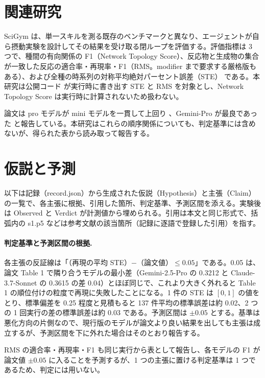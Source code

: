 \documentclass{article}
\providecommand{\unverified}[1]{#1}
\begin{document}
\section{関連研究}
\label{sec:related}
SciGym \citep{duan-2025-measuring} は、単一スキルを測る既存のベンチマークと異なり、エージェントが自ら摂動実験を設計してその結果を受け取る閉ループを評価する。評価指標は 3 つで、種間の有向関係の F1（Network Topology Score）、反応物と生成物の集合が一致した反応の適合率・再現率・F1（RMS。modifier まで要求する厳格版もある）\cite[s1.p8]{duan-2025-measuring}、および全種の時系列の対称平均絶対パーセント誤差（STE）\cite[s1.p9]{duan-2025-measuring} である。本研究は公開コード \citep{h4duan-2025-scigym} が実行時に書き出す STE と RMS を対象とし、Network Topology Score は実行時に計算されないため扱わない。

論文は pro モデルが mini モデルを一貫して上回り \cite[s1.p6]{duan-2025-measuring}、Gemini-Pro が最良であった \cite[s1.p7]{duan-2025-measuring} と報告している。本研究はこれらの順序関係についても、判定基準には含めないが、得られた表から読み取って報告する。

\section{仮説と予測}
\label{sec:hypothesis}
以下は記録（record.json）から生成された仮説（Hypothesis）と主張（Claim）の一覧で、各主張に根拠、引用した箇所、判定基準、予測区間を添える。実験後は Observed と Verdict が計測値から埋められる。引用は本文と同じ形式で、括弧内の s1.p5 などは参考文献の該当箇所（記録に逐語で登録した引用）を指す。



\paragraph{判定基準と予測区間の根拠.}
各主張の反証線は「（再現の平均 STE）$-$（論文値）$\le 0.05$」である。0.05 は、論文 Table 1 で隣り合うモデルの最小差（Gemini-2.5-Pro の \unverified{0.3212} と Claude-3.7-Sonnet の \unverified{0.3615} の差 \unverified{0.04}）とほぼ同じで、これより大きく外れると Table 1 の順位付けの粒度で再現に失敗したことになる。1 件の STE は $[0, 1]$ の値をとり、標準偏差を 0.25 程度と見積もると 137 件平均の標準誤差は約 0.02、2 つの 1 回実行の差の標準誤差は約 0.03 である。予測区間は $\pm 0.05$ とする。基準は悪化方向の片側なので、現行版のモデルが論文より良い結果を出しても主張は成立するが、予測区間を下に外れた場合はそのとおり報告する。

RMS の適合率・再現率・F1 も同じ実行から表として報告し、各モデルの F1 が論文値 $\pm 0.05$ に入ることを予測するが、1 つの主張に置ける判定基準は 1 つであるため、判定には用いない。
\end{document}
